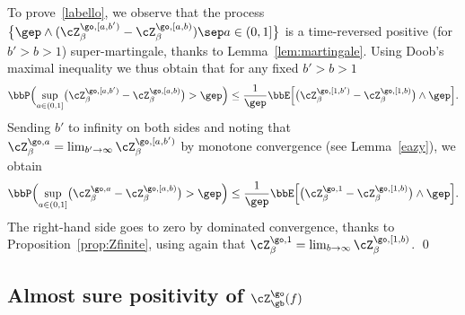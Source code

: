 To prove~\eqref{labello}, we observe that
the process $\bigl\{ \gep \wedge (\cZ^{\go,[a,b')}_\beta - \cZ^{\go,[a,b)}_\beta) \sep a\in(0,1] \bigr\}$ is a time-reversed positive (for $b'>b>1$) super-martingale, thanks to Lemma~\ref{lem:martingale}.
Using Doob's maximal inequality we thus obtain that for any fixed $b'>b>1$
\begin{equation}
\bbP\Bigl(\sup_{a\in(0,1]}\bigl(\cZ^{\go,[a,b')}_\beta - \cZ^{\go,[a,b)}_\beta\bigr) >\gep \Bigr)\le \frac{1}{\gep}\bbE \Bigl[ \bigl(\cZ^{\go,[1,b')}_\beta - \cZ^{\go,[1,b)}_\beta\bigr) \wedge \gep \Bigr].
\end{equation}
Sending $b'$ to infinity on both sides
and noting that $\cZ^{\go,a}_\beta = \lim_{b'\to\infty} \cZ^{\go,[a,b')}_\beta$ by monotone convergence (see Lemma~\ref{eazy}),
we obtain
\begin{equation}\label{thetruc}
\bbP\Bigl(\sup_{a\in(0,1]}\bigl(\cZ^{\go,a}_\beta - \cZ^{\go,[a,b)}_\beta\bigr) > \gep \Bigr)\le \frac{1}{\gep}\bbE \Bigl[ \bigl(\cZ^{\go,1}_\beta - \cZ^{\go,[1,b)}_\beta\bigr) \wedge \gep \Bigr].
\end{equation}
The right-hand side goes to zero by dominated convergence, thanks to Proposition~\ref{prop:Zfinite},
using again that $\cZ^{\go,1}_\beta = \lim_{b\to\infty} \cZ^{\go,[1,b)}_\beta$.
\qed

\subsection{Almost sure positivity of $\cZ_{\gb}^{\go}(f)$}
\label{sec:positivity}

